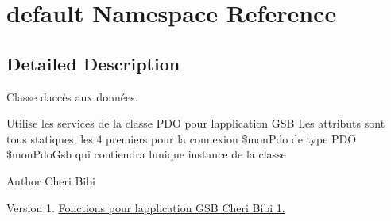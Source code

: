 \hypertarget{namespacedefault}{}\section{default Namespace Reference}
\label{namespacedefault}


\subsection{Detailed Description}
Classe d\textquotesingle{}accès aux données.

Utilise les services de la classe P\+DO pour l\textquotesingle{}application G\+SB Les attributs sont tous statiques, les 4 premiers pour la connexion \$mon\+Pdo de type P\+DO \$mon\+Pdo\+Gsb qui contiendra l\textquotesingle{}unique instance de la classe

\begin{DoxyAuthor}{Author}
Cheri Bibi 
\end{DoxyAuthor}
\begin{DoxyVersion}{Version}
1. \hyperlink{}{Fonctions pour l\textquotesingle{}application G\+SB  Cheri Bibi  1. }
\end{DoxyVersion}
